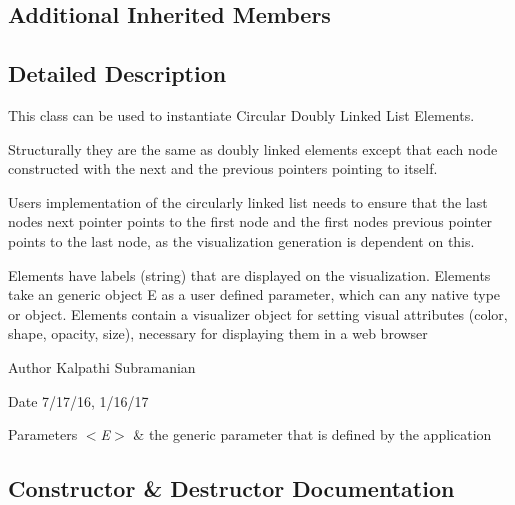 \subsection*{Additional Inherited Members}


\subsection{Detailed Description}
This class can be used to instantiate Circular Doubly Linked List Elements. 

Structurally they are the same as doubly linked elements except that each node constructed with the next and the previous pointers pointing to itself.

User\textquotesingle{}s implementation of the circularly linked list needs to ensure that the last node\textquotesingle{}s next pointer points to the first node and the first node\textquotesingle{}s previous pointer points to the last node, as the visualization generation is dependent on this.

Elements have labels (string) that are displayed on the visualization. Elements take an generic object E as a user defined parameter, which can any native type or object. Elements contain a visualizer object for setting visual attributes (color, shape, opacity, size), necessary for displaying them in a web browser

\begin{DoxyAuthor}{Author}
Kalpathi Subramanian 
\end{DoxyAuthor}
\begin{DoxyDate}{Date}
7/17/16, 1/16/17
\end{DoxyDate}

\begin{DoxyParams}{Parameters}
{\em $<$\+E$>$} & the generic parameter that is defined by the application \\
\hline
\end{DoxyParams}


\subsection{Constructor \& Destructor Documentation}
\hypertarget{classbridges_1_1base_1_1_circ_d_lelement_ad14ccb772d52c36802c118f2b3f15d59}{}\label{classbridges_1_1base_1_1_circ_d_lelement_ad14ccb772d52c36802c118f2b3f15d59} 
